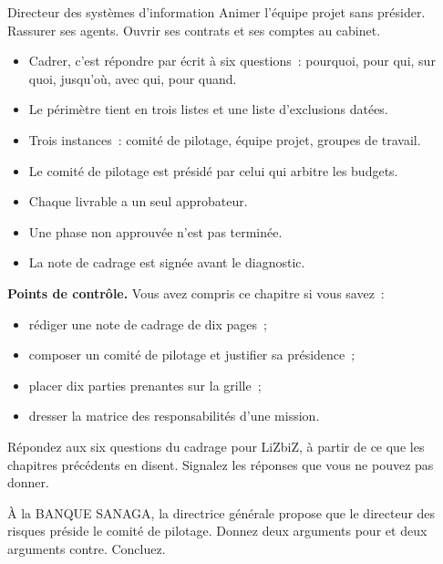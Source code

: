 \begin{boxmetier}{Directeur des systèmes d'information}
Animer l'équipe projet sans présider. Rassurer ses agents. Ouvrir ses contrats et ses comptes au cabinet.
\end{boxmetier}

\begin{boxresume}
\begin{itemize}
    \item Cadrer, c'est répondre par écrit à six questions~: pourquoi, pour qui, sur quoi, jusqu'où, avec qui, pour quand.
    \item Le périmètre tient en trois listes et une liste d'exclusions datées.
    \item Trois instances~: comité de pilotage, équipe projet, groupes de travail.
    \item Le comité de pilotage est présidé par celui qui arbitre les budgets.
    \item Chaque livrable a un seul approbateur.
    \item Une phase non approuvée n'est pas terminée.
    \item La note de cadrage est signée avant le diagnostic.
\end{itemize}
\end{boxresume}

\begin{boxinfo}
\textbf{Points de contrôle.} Vous avez compris ce chapitre si vous savez~:
\begin{itemize}
    \item rédiger une note de cadrage de dix pages~;
    \item composer un comité de pilotage et justifier sa présidence~;
    \item placer dix parties prenantes sur la grille~;
    \item dresser la matrice des responsabilités d'une mission.
\end{itemize}
\end{boxinfo}

\begin{boxexo}[title={\ding{45}\quad Exercice~8.1. Les six questions \niveaubase}]
Répondez aux six questions du cadrage pour LiZbiZ, à partir de ce que les chapitres précédents en disent. Signalez les réponses que vous ne pouvez pas donner.
\end{boxexo}

\begin{boxexo}[title={\ding{45}\quad Exercice~8.2. La présidence \niveaumoyen}]
À la BANQUE SANAGA, la directrice générale propose que le directeur des risques préside le comité de pilotage. Donnez deux arguments pour et deux arguments contre. Concluez.
\end{boxexo}

